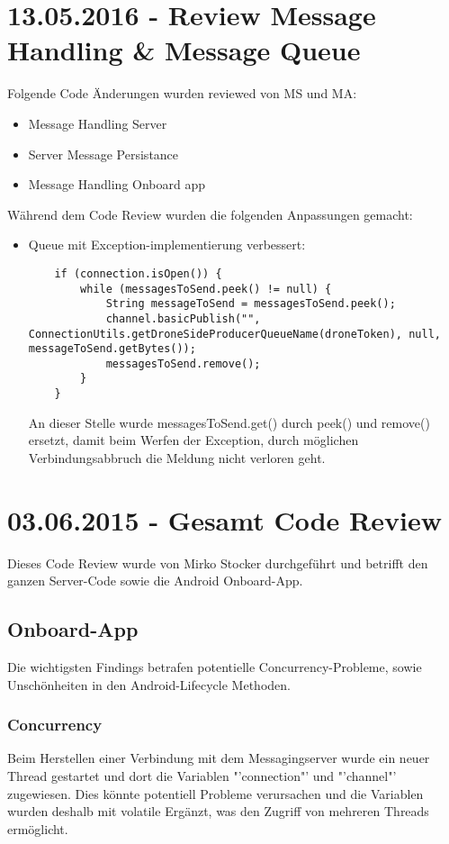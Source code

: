 \section{13.05.2016 - Review Message Handling \& Message Queue}
Folgende Code Änderungen wurden reviewed von MS und MA:
\begin{itemize}
	\item{Message Handling Server}
	\item{Server Message Persistance}
	\item{Message Handling Onboard app}
\end{itemize}
Während dem Code Review wurden die folgenden Anpassungen gemacht:
\begin{itemize}
	\item{Queue mit Exception-implementierung verbessert:
	\begin{lstlisting}
    if (connection.isOpen()) {
        while (messagesToSend.peek() != null) {
            String messageToSend = messagesToSend.peek();
            channel.basicPublish("", ConnectionUtils.getDroneSideProducerQueueName(droneToken), null, messageToSend.getBytes());
            messagesToSend.remove();
        }
    }
	\end{lstlisting}
	An dieser Stelle wurde messagesToSend.get() durch peek() und remove() ersetzt, damit beim Werfen der Exception, durch möglichen Verbindungsabbruch die Meldung nicht verloren geht.}

\end{itemize}
\section{03.06.2015 - Gesamt Code Review}

Dieses Code Review wurde von Mirko Stocker durchgeführt und betrifft den ganzen Server-Code sowie die Android Onboard-App.

\subsection{Onboard-App}
	 
Die wichtigsten Findings betrafen potentielle Concurrency-Probleme, sowie Unschönheiten in den Android-Lifecycle Methoden.

\subsubsection{Concurrency}

Beim Herstellen einer Verbindung mit dem Messagingserver wurde ein neuer Thread gestartet und dort die Variablen "'connection"' und "'channel"' zugewiesen.
Dies könnte potentiell Probleme verursachen und die Variablen wurden deshalb mit volatile Ergänzt, was den Zugriff von mehreren Threads ermöglicht.

